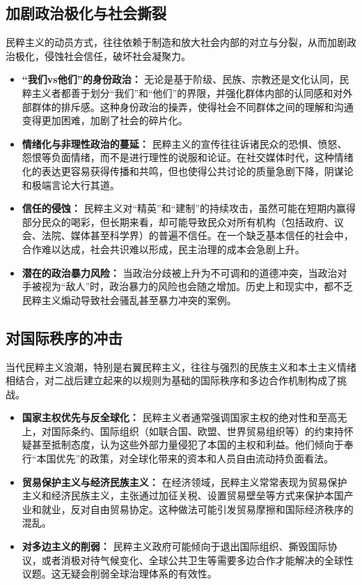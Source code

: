 \documentclass[UTF8, 10pt]{ctexbook}
\begin{document}
\subsection{加剧政治极化与社会撕裂}
民粹主义的动员方式，往往依赖于制造和放大社会内部的对立与分裂，从而加剧政治极化，侵蚀社会信任，破坏社会凝聚力。
\begin{itemize}
    \item \textbf{“我们vs他们”的身份政治：} 无论是基于阶级、民族、宗教还是文化认同，民粹主义者都善于划分“我们”和“他们”的界限，并强化群体内部的认同感和对外部群体的排斥感。这种身份政治的操弄，使得社会不同群体之间的理解和沟通变得更加困难，加剧了社会的碎片化。
    \item \textbf{情绪化与非理性政治的蔓延：} 民粹主义的宣传往往诉诸民众的恐惧、愤怒、怨恨等负面情绪，而不是进行理性的说服和论证。在社交媒体时代，这种情绪化的表达更容易获得传播和共鸣，但也使得公共讨论的质量急剧下降，阴谋论和极端言论大行其道。
    \item \textbf{信任的侵蚀：} 民粹主义对“精英”和“建制”的持续攻击，虽然可能在短期内赢得部分民众的喝彩，但长期来看，却可能导致民众对所有机构（包括政府、议会、法院、媒体甚至科学界）的普遍不信任。在一个缺乏基本信任的社会中，合作难以达成，社会共识难以形成，民主治理的成本会急剧上升。
    \item \textbf{潜在的政治暴力风险：} 当政治分歧被上升为不可调和的道德冲突，当政治对手被视为“敌人”时，政治暴力的风险也会随之增加。历史上和现实中，都不乏民粹主义煽动导致社会骚乱甚至暴力冲突的案例。
\end{itemize}

\subsection{对国际秩序的冲击}
当代民粹主义浪潮，特别是右翼民粹主义，往往与强烈的民族主义和本土主义情绪相结合，对二战后建立起来的以规则为基础的国际秩序和多边合作机制构成了挑战。
\begin{itemize}
    \item \textbf{国家主权优先与反全球化：} 民粹主义者通常强调国家主权的绝对性和至高无上，对国际条约、国际组织（如联合国、欧盟、世界贸易组织等）的约束持怀疑甚至抵制态度，认为这些外部力量侵犯了本国的主权和利益。他们倾向于奉行“本国优先”的政策，对全球化带来的资本和人员自由流动持负面看法。
    \item \textbf{贸易保护主义与经济民族主义：} 在经济领域，民粹主义常常表现为贸易保护主义和经济民族主义，主张通过加征关税、设置贸易壁垒等方式来保护本国产业和就业，反对自由贸易协定。这种做法可能引发贸易摩擦和国际经济秩序的混乱。
    \item \textbf{对多边主义的削弱：} 民粹主义政府可能倾向于退出国际组织、撕毁国际协议，或者消极对待气候变化、全球公共卫生等需要多边合作才能解决的全球性议题。这无疑会削弱全球治理体系的有效性。
\end{itemize}
\end{document}
